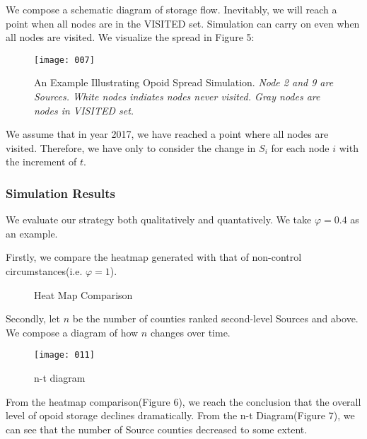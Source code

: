 We compose a schematic diagram of storage flow. Inevitably, we will reach a point when all nodes are in the VISITED set. Simulation can carry on even when all nodes are visited. We visualize the spread in Figure 5:

\begin{figure}[H]
	\centering
	\texttt{[image: 007]}
	\caption{An Example Illustrating Opoid Spread Simulation. \textit{Node 2 and 9 are Sources. White nodes indiates nodes never visited. Gray nodes are nodes in VISITED set.}}
\end{figure}

We assume that in year 2017, we have reached a point where all nodes are visited. Therefore, we have only to consider the change in $S_i$ for each node $i$ with the increment of $t$. 

\subsubsection{Simulation Results}
We evaluate our strategy both qualitatively and quantatively. We take $\varphi = 0.4$ as an example.

Firstly, we compare the heatmap generated with that of non-control circumstances(i.e. $\varphi=1$). 

\begin{figure}[H]
	\centering
	\caption{Heat Map Comparison}
\end{figure}
	
Secondly, let $n$ be the number of counties ranked second-level Sources and above. We compose a diagram of how $n$ changes over time. 

\begin{figure}[H]
	\centering
	\texttt{[image: 011]}
	\caption{n-t diagram}
\end{figure}

From the heatmap comparison(Figure 6), we reach the conclusion that the overall level of opoid storage declines dramatically. From the n-t Diagram(Figure 7), we can see that the number of Source counties decreased to some extent. 

